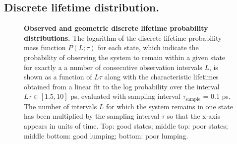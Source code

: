 \subsection{Discrete lifetime distribution.}
\label{validation:section:lifetime-distribution-test}

\begin{figure}[tbp]
  \begin{center}
  \end{center}
  \caption{
  {\bf Observed and geometric discrete lifetime probability distributions.} 
  The logarithm of the discrete lifetime probability mass function $P(L ; \tau)$ for each state, which indicate the probability of observing the system to remain within a given state for exactly a a number  of consecutive observation intervals $L$, is shown as a function of $L \tau$ along with the characteristic lifetimes obtained from a linear fit to the log probability over the interval $L \tau \in [1.5,10]$ ps, evaluated with sampling interval $\tau_\mathrm{sample}$ = 0.1 ps.
  The number of intervals $L$ for which the system remains in one state has been multiplied by the sampling interval $\tau$ so that the x-axis appears in units of time.
  Top: good states; middle top: poor states; middle bottom: good lumping; bottom: poor lumping.
  }
  \label{validation:figure:lifetime-distributions}
\end{figure}

